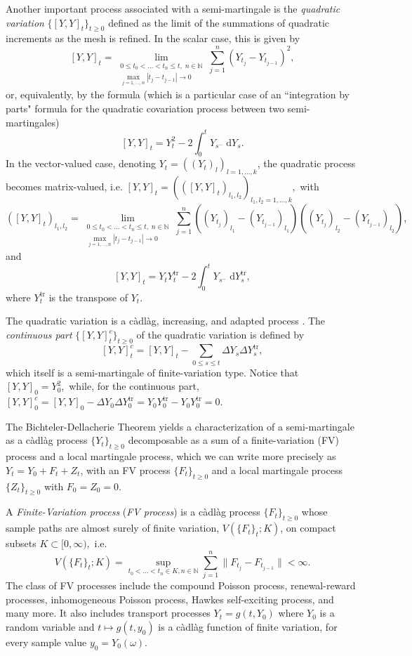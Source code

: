 \documentclass[reqno,12pt]{amsart}
\theoremstyle{plain} %
\theoremstyle{definition} %
\newcommand{\tr}{{\operatorname{tr}}}
\begin{document}
Another important process associated with a semi-martingale is the \emph{quadratic variation} $\{[Y, Y]_t\}_{t\geq 0}$ defined as the limit of the summations of quadratic increments as the mesh is refined. In the scalar case, this is given by
\[
    [Y, Y]_t = \lim_{\substack{0\leq t_0 < \ldots < t_n \leq t, \;n\in \mathbb{N} \\ \max_{j=1, \ldots, n}|t_j - t_{j-1}| \rightarrow 0}} \sum_{j=1}^n (Y_{t_j} - Y_{t_{j-1}})^2,
\]
or, equivalently, by the formula (which is a particular case of an ``integration by parts" formula for the quadratic covariation process between two semi-martingales)
\[
    [Y, Y]_t = Y_t^2 - 2\int_0^t Y_{s^-} \;\mathrm{d}Y_s.
\]
In the vector-valued case, denoting $Y_t = ((Y_t)_l)_{l=1, \ldots, k}$, the quadratic process becomes matrix-valued, i.e. $[Y, Y]_t = (([Y, Y]_t)_{l_1,l_2})_{l_1,l_2=1,\ldots, k},$ with
\[
    ([Y, Y]_t)_{l_1,l_2} = \lim_{\substack{0\leq t_0 < \ldots < t_n \leq t, \;n\in \mathbb{N} \\ \max_{j=1, \ldots, n}|t_j - t_{j-1}| \rightarrow 0}} \sum_{j=1}^n ((Y_{t_j})_{l_1} - (Y_{t_{j-1}})_{l_1}) ((Y_{t_j})_{l_2} - (Y_{t_{j-1}})_{l_2}),
\]
and
\[
    [Y, Y]_t = Y_tY_t^\tr - 2\int_0^t Y_{s^-} \;\mathrm{d}Y_s^\tr,
\]
where $Y_t^\tr$ is the transpose of $Y_t.$

The quadratic variation is a c\`adl\`ag, increasing, and adapted process \cite[Theorem II.22]{Protter2005}. The \emph{continuous part} $\{[Y, Y]_t^c\}_{t\geq 0}$ of the quadratic variation is defined by
\[
    [Y, Y]_t^c = [Y, Y]_t - \sum_{0\leq s \leq t} \Delta Y_s\Delta Y_s^\tr,
\]
which itself is a semi-martingale of finite-variation type. Notice that $[Y, Y]_0 = Y_0^2,$ while, for the continuous part, $[Y, Y]_0^c = [Y, Y]_0 - \Delta Y_0\Delta Y_0^\tr = Y_0 Y_0^\tr - Y_0 Y_0^\tr = 0.$

The Bichteler-Dellacherie Theorem \cite[Theorem III.47]{Protter2005} yields a characterization of a semi-martingale as a c\`adl\`ag process $\{Y_t\}_{t\geq 0}$ decomposable as a sum of a finite-variation (FV) process and a local martingale process, which we can write more precisely as $Y_t = Y_0 + F_t + Z_t$, with an FV process $\{F_t\}_{t\geq 0}$ and a local martingale process $\{Z_t\}_{t\geq 0}$ with $F_0 = Z_0 = 0.$

A \emph{Finite-Variation process} (\emph{FV process}) is a c\`adl\`ag process $\{F_t\}_{t \geq 0}$ whose sample paths are almost surely of finite variation, $V(\{F_t\}_t; K)$, on compact subsets $K\subset [0, \infty),$ i.e.
\[ V(\{F_t\}_t; K) = \sup_{t_0 < \ldots < t_n \in K, n\in \mathbb{N}} \sum_{j=1}^n \|F_{t_j} - F_{t_{j-1}}\| < \infty.
\]
The class of FV processes include the compound Poisson process, renewal-reward processes, inhomogeneous Poisson process, Hawkes self-exciting process, and many more. It also includes transport processes $Y_t = g(t, Y_0)$ where $Y_0$ is a random variable and $t \mapsto g(t, y_0)$ is a c\`adl\`ag function of finite variation, for every sample value $y_0=Y_0(\omega)$.
\end{document}
